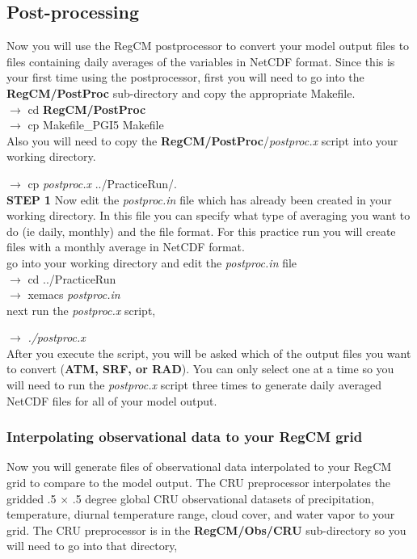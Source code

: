 \subsection{Post-processing}
Now you will use the RegCM postprocessor to convert your model output files 
to files containing daily averages of the variables in NetCDF format.  Since this
is your first time using the postprocessor, first you will need to go into 
the {\bf RegCM/PostProc} sub-directory and copy the appropriate Makefile. \\

\indent 
$\rightarrow$   cd {\bf RegCM/PostProc} \\
\indent 
$\rightarrow$   cp Makefile\_PGI5  Makefile \\

\noindent
Also you will need to copy the {\bf RegCM/PostProc}/{\it postproc.x} script into 
your working directory.

\indent
$\rightarrow$   cp {\it postproc.x}  ../PracticeRun/. \\

\noindent
{\bf STEP 1} Now edit the {\it postproc.in} file which has already been created in your
working directory.  In this file you can specify what type of averaging you 
want to do (ie daily, monthly) and the file format.  For this practice run 
you will create files with a monthly average in NetCDF format. \\

\noindent
go into your working directory and edit the {\it postproc.in} file \\

\indent 
$\rightarrow$   cd ../PracticeRun \\
\indent 
$\rightarrow$   xemacs {\it postproc.in} \\

\noindent
next run the {\it postproc.x} script,

\indent 
$\rightarrow$   {\it ./postproc.x} \\

\noindent
After you execute the script, you will be asked which of the output files
you want to convert ({\bf ATM, SRF, or RAD}).  You can only select 
one at a time so you will need to run the {\it postproc.x} script three times
to generate daily averaged NetCDF files for all of your model output.

\subsubsection{Interpolating observational data to your RegCM grid}
Now you will generate files of observational data interpolated to your
RegCM grid to compare to the model output.  The CRU preprocessor 
interpolates the gridded .5 $\times$ .5 degree global CRU observational 
datasets of precipitation, temperature, diurnal temperature range, 
cloud cover, and water vapor to your grid.  The CRU preprocessor is 
in the {\bf RegCM/Obs/CRU} sub-directory so you will need to go into that
directory, \\

